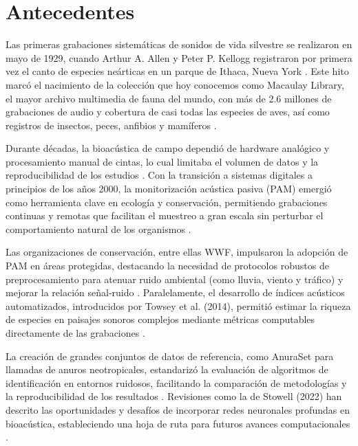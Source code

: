\chapter{Antecedentes}\label{chapter: VRP}


Las primeras grabaciones sistemáticas de sonidos de vida 
silvestre se realizaron en mayo de 1929, cuando Arthur A. 
Allen y Peter P. Kellogg registraron por primera vez el canto 
de especies neárticas en un parque de Ithaca, Nueva York 
\cite{macaulaylibrary1929}. Este hito marcó el nacimiento de 
la colección que hoy conocemos como Macaulay Library, el 
mayor archivo multimedia de fauna del mundo, con más de 2.6 
millones de grabaciones de audio y cobertura de casi todas 
las especies de aves, así como registros de insectos, peces, 
anfibios y mamíferos \cite{allaboutbirds1929}.

Durante décadas, la bioacústica de campo dependió de hardware 
analógico y procesamiento manual de cintas, lo cual limitaba 
el volumen de datos y la reproducibilidad de los estudios 
\cite{blumstein2011acoustic}. Con la transición a sistemas digitales 
a principios de los años 2000, la monitorización acústica 
pasiva (PAM) emergió como herramienta clave en ecología y 
conservación, permitiendo grabaciones continuas y remotas que 
facilitan el muestreo a gran escala sin perturbar el 
comportamiento natural de los organismos \cite{acevedo2009automated}.

Las organizaciones de conservación, entre ellas WWF, 
impulsaron la adopción de PAM en áreas protegidas, 
destacando la necesidad de protocolos robustos de 
preprocesamiento para atenuar ruido ambiental (como lluvia, 
viento y tráfico) y mejorar la relación señal-ruido 
\cite{blumstein2011acoustic}. Paralelamente, el desarrollo de 
índices acústicos automatizados, introducidos por Towsey et 
al. (2014), permitió estimar la riqueza de especies en 
paisajes sonoros complejos mediante métricas computables 
directamente de las grabaciones \cite{towsey2014use}.

La creación de grandes conjuntos de datos de referencia, 
como AnuraSet para llamadas de anuros neotropicales, 
estandarizó la evaluación de algoritmos de identificación en 
entornos ruidosos, facilitando la comparación de metodologías 
y la reproducibilidad de los resultados 
\cite{canas2023dataset}. Revisiones como 
la de Stowell (2022) han descrito las oportunidades y 
desafíos de incorporar redes neuronales profundas en 
bioacústica, estableciendo una hoja de ruta para futuros 
avances computacionales \cite{stowell2022computational}.

